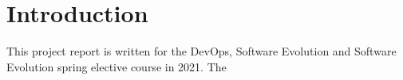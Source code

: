\section{Introduction}
This project report is written for the DevOps, Software Evolution and Software Evolution spring elective course in 2021. The 